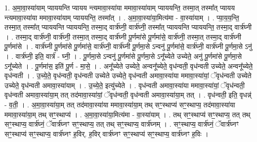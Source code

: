 \documentclass[17pt]{extarticle}
\begin{document}
1. अ॒मा॒वा॒स्या॑याम् प्याययन्ति प्यायय न्त्यमावा॒स्या॑या ममावा॒स्या॑याम् प्याययन्ति॒ तस्मा॒त् तस्मा᳚त् प्यायय न्त्यमावा॒स्या॑या ममावा॒स्या॑याम् प्याययन्ति॒ तस्मा᳚त् । . अ॒मा॒वा॒स्या॑या॒मित्य॑मा - वा॒स्या॑याम् । . प्या॒य॒य॒न्ति॒ तस्मा॒त् तस्मा᳚त् प्याययन्ति प्याययन्ति॒ तस्मा॒द् वार्त्र॑घ्नी॒ वार्त्र॑घ्नी॒ तस्मा᳚त् प्याययन्ति प्याययन्ति॒ तस्मा॒द् वार्त्र॑घ्नी । . तस्मा॒द् वार्त्र॑घ्नी॒ वार्त्र॑घ्नी॒ तस्मा॒त् तस्मा॒द् वार्त्र॑घ्नी पू॒र्णमा॑से पू॒र्णमा॑से॒ वार्त्र॑घ्नी॒ तस्मा॒त् तस्मा॒द् वार्त्र॑घ्नी पू॒र्णमा॑से । . वार्त्र॑घ्नी पू॒र्णमा॑से पू॒र्णमा॑से॒ वार्त्र॑घ्नी॒ वार्त्र॑घ्नी पू॒र्णमा॒से ऽन्वनु॑ पू॒र्णमा॑से॒ वार्त्र॑घ्नी॒ वार्त्र॑घ्नी पू॒र्णमा॒से ऽनु॑ । . वार्त्र॑घ्नी॒ इति॒ वार्त्र॑ - घ्नी॒ । . पू॒र्णमा॒से ऽन्वनु॑ पू॒र्णमा॑से पू॒र्णमा॒से ऽनू᳚च्येते उच्येते॒ अनु॑ पू॒र्णमा॑से पू॒र्णमा॒से ऽनू᳚च्येते । . पू॒र्णमा॑स॒ इति॑ पू॒र्ण - मा॒से॒ । . अनू᳚च्येते उच्येते॒ अन्वनू᳚च्येते॒ वृध॑न्वती॒ वृध॑न्वती उच्येते॒ अन्वनू᳚च्येते॒ वृध॑न्वती । . उ॒च्ये॒ते॒ वृध॑न्वती॒ वृध॑न्वती उच्येते उच्येते॒ वृध॑न्वती अमावा॒स्या॑या ममावा॒स्या॑यां॒ ॅवृध॑न्वती उच्येते उच्येते॒ वृध॑न्वती अमावा॒स्या॑याम् । . उ॒च्ये॒ते॒ इत्यु॑च्येते । . वृध॑न्वती अमावा॒स्या॑या ममावा॒स्या॑यां॒ ॅवृध॑न्वती॒ वृध॑न्वती अमावा॒स्या॑या॒म् तत् तद॑मावा॒स्या॑यां॒ ॅवृध॑न्वती॒ वृध॑न्वती अमावा॒स्या॑या॒म् तत् । . वृध॑न्वती॒ इति॒ वृधन्न्॑ - व॒ती॒ । . अ॒मा॒वा॒स्या॑या॒म् तत् तद॑मावा॒स्या॑या ममावा॒स्या॑या॒म् तथ् सꣳ॒॒स्थाप्य॑ सꣳ॒॒स्थाप्य॒ तद॑मावा॒स्या॑या ममावा॒स्या॑या॒म् तथ् सꣳ॒॒स्थाप्य॑ । . अ॒मा॒वा॒स्या॑या॒मित्य॑मा - वा॒स्या॑याम् । . तथ् सꣳ॒॒स्थाप्य॑ सꣳ॒॒स्थाप्य॒ तत् तथ् सꣳ॒॒स्थाप्य॒ वार्त्र॑घ्नं॒ ॅवार्त्र॑घ्नꣳ सꣳ॒॒स्थाप्य॒ तत् तथ् सꣳ॒॒स्थाप्य॒ वार्त्र॑घ्नम् । . सꣳ॒॒स्थाप्य॒ वार्त्र॑घ्नं॒ ॅवार्त्र॑घ्नꣳ सꣳ॒॒स्थाप्य॑ सꣳ॒॒स्थाप्य॒ वार्त्र॑घ्नꣳ ह॒विर्. ह॒विर् वार्त्र॑घ्नꣳ सꣳ॒॒स्थाप्य॑ सꣳ॒॒स्थाप्य॒ वार्त्र॑घ्नꣳ ह॒विः । \newline
\end{document}

